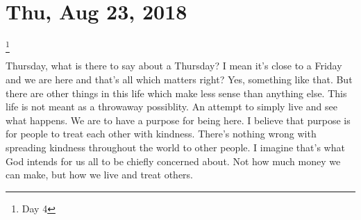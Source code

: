 \section{Thu, Aug 23, 2018}\footnote{Day 4}

Thursday, what is there to say about a Thursday? I mean it's close to a Friday and we
are here and that's all which matters right? Yes, something like that. But there are
other things in this life which make less sense than anything else. This life is not
meant as a throwaway possiblity. An attempt to simply live and see what happens. We
are to have a purpose for being here. I believe that purpose is for people to treat
each other with kindness. There's nothing wrong with spreading kindness throughout
the world to other people. I imagine that's what God intends for us all to be chiefly
concerned about. Not how much money we can make, but how we live and treat others.
